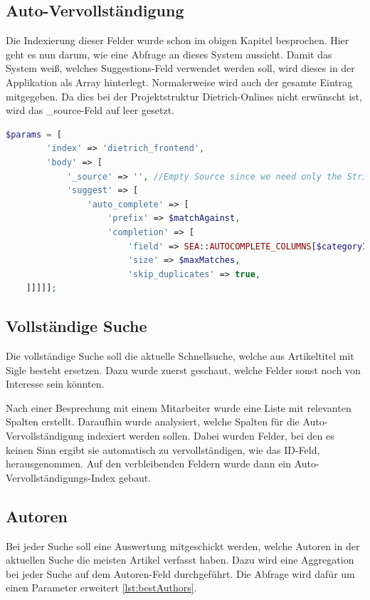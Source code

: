\subsection{Auto-Vervollständigung}

Die Indexierung dieser Felder wurde schon im obigen Kapitel besprochen. Hier geht es nun darum, wie eine Abfrage an dieses System aussieht. Damit das System weiß, welches Suggestions-Feld verwendet werden soll, wird dieses in der Applikation als Array hinterlegt. Normalerweise wird auch der gesamte Eintrag mitgegeben. Da dies bei der Projektstruktur Dietrich-Onlines nicht erwünscht ist, wird das \_source-Feld auf leer gesetzt.


\begin{lstlisting}[language=PHP, frame=single, label={lst:autocompleParams}] 
    $params = [
        'index' => 'dietrich_frontend',
        'body' => [
            '_source' => '', //Empty Source since we need only the String
            'suggest' => [
                'auto_complete' => [
                    'prefix' => $matchAgainst,
                    'completion' => [
                        'field' => SEA::AUTOCOMPLETE_COLUMNS[$categoryIndex],
                        'size' => $maxMatches,
                        'skip_duplicates' => true,
    ]]]]];
\end{lstlisting}

\subsection{Vollständige Suche}

Die vollständige Suche soll die aktuelle Schnellsuche, welche aus Artikeltitel mit Sigle besteht ersetzen. Dazu wurde zuerst geschaut, welche Felder sonst noch von Interesse sein könnten. 

Nach einer Besprechung mit einem Mitarbeiter wurde eine Liste mit relevanten Spalten erstellt. Daraufhin wurde analysiert, welche Spalten für die Auto-Vervollständigung indexiert werden sollen. Dabei wurden Felder, bei den es keinen Sinn ergibt sie automatisch zu vervollständigen, wie das ID-Feld, herausgenommen. Auf den verbleibenden Feldern wurde dann ein Auto-Vervollständigungs-Index gebaut.

\subsection{Autoren}

Bei jeder Suche soll eine Auswertung mitgeschickt werden, welche Autoren in der aktuellen Suche die meisten Artikel verfasst haben. Dazu wird eine Aggregation bei jeder Suche auf dem Autoren-Feld durchgeführt. Die Abfrage wird dafür um einen Parameter erweitert \ref{lst:bestAuthors}.

